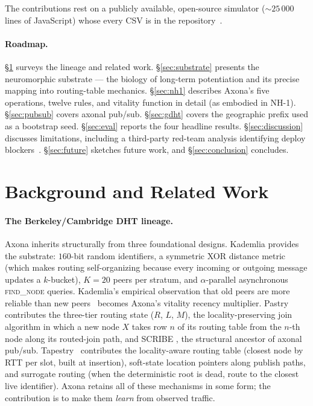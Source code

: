 \documentclass[conference]{IEEEtran}
\newcommand{\axona}{Axona\xspace}
\newcommand{\nhone}{NH-1\xspace}
\begin{document}
\noindent
The contributions rest on a publicly available, open-source simulator
($\sim\!25\,000$ lines of JavaScript) whose every CSV is in the
repository~\cite{dhtsim2026}.

\paragraph{Roadmap.}
\S\ref{sec:related} surveys the lineage and related work. \S\ref{sec:substrate}
presents the neuromorphic substrate --- the biology of long-term
potentiation and its precise mapping into routing-table mechanics.
\S\ref{sec:nh1} describes \axona's five operations, twelve rules, and
vitality function in detail (as embodied in \nhone). \S\ref{sec:pubsub} covers axonal pub/sub.
\S\ref{sec:gdht} covers the geographic prefix used as a bootstrap seed.
\S\ref{sec:eval} reports the four headline results. \S\ref{sec:discussion}
discusses limitations, including a third-party red-team analysis identifying
deploy blockers~\cite{nh1redteam2026}. \S\ref{sec:future} sketches future
work, and \S\ref{sec:conclusion} concludes.

\section{Background and Related Work}
\label{sec:related}

\paragraph{The Berkeley/Cambridge DHT lineage.}
\axona inherits structurally from three foundational designs. Kademlia
\cite{maymounkov2002kademlia} provides the substrate: $160$-bit random
identifiers, a symmetric XOR distance metric (which makes routing
self-organizing because every incoming or outgoing message updates a
$k$-bucket), $K=20$ peers per stratum, and $\alpha$-parallel asynchronous
\textsc{find\_node} queries. Kademlia's empirical observation that old
peers are more reliable than new peers~\cite{saroiu2003measurement}
becomes \axona's vitality recency multiplier. Pastry~\cite{rowstron2001pastry}
contributes
the three-tier routing state ($R$, $L$, $M$), the locality-preserving
join algorithm in which a new node $X$ takes row $n$ of its routing
table from the $n$-th node along its routed-join path, and SCRIBE
\cite{castro2002scribe}, the structural ancestor of axonal pub/sub.
Tapestry~\cite{zhao2004tapestry} contributes the locality-aware
routing table (closest node by RTT per slot, built at insertion),
soft-state location pointers along publish paths, and surrogate
routing (when the deterministic root is dead, route to the closest
live identifier). \axona retains all of these mechanisms in some form;
the contribution is to make them \emph{learn} from observed traffic.
\end{document}
